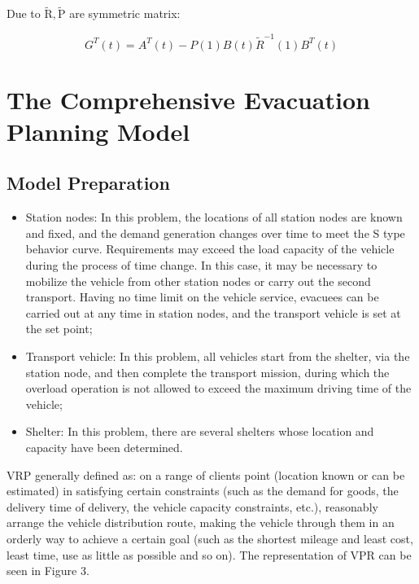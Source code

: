\documentclass{mcmthesis}
\begin{document}
Due to $\widetilde{\mathrm{R}},\widetilde{\mathrm{P}}$ are symmetric matrix:

$$G^T(t)=A^{T}(t)-P(1) B(t) \widetilde{R}^{-1}(1) B^{T}(t)$$




\section{The Comprehensive Evacuation Planning Model}
\subsection{Model Preparation}

\begin{itemize}

\item Station nodes: In this problem, the locations of all station nodes are known and fixed, and the demand generation changes over time to meet the S type behavior curve. Requirements may exceed the load capacity of the vehicle during the process of time change. In this case, it may be necessary to mobilize the vehicle from other station nodes or carry out the second transport. Having no time limit on the vehicle service, evacuees can be carried out at any time in station nodes, and the transport vehicle is set at the set point;
\item Transport vehicle: In this problem, all vehicles start from the shelter, via the station node, and then complete the transport mission, during which the overload operation is not allowed to exceed the maximum driving time of the vehicle;

\item Shelter: In this problem, there are several shelters whose location and capacity have been determined.
\end{itemize}

VRP \cite{Dikas2016Solving,He2015Model} generally defined as: on a range of clients point (location known or can be estimated) in satisfying certain constraints (such as the demand for goods, the delivery time of delivery, the vehicle capacity constraints, etc.), reasonably arrange the vehicle distribution route, making the vehicle through them in an orderly way to achieve a certain goal (such as the shortest mileage and least cost, least time, use as little as possible and so on). The representation of VPR can be seen in Figure 3.
\end{document}
